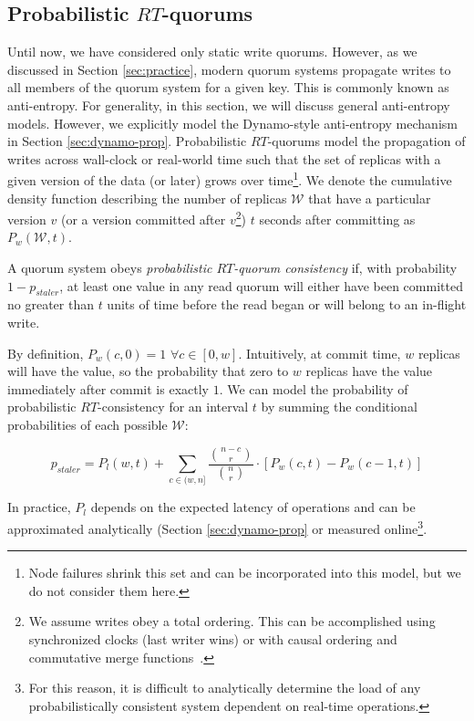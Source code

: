 \documentclass{vldb}
\begin{document}
\subsection{Probabilistic $RT$-quorums}

Until now, we have considered only static write quorums.  However, as
we discussed in Section \ref{sec:practice}, modern quorum systems
propagate writes to all members of the quorum system for a given key.
This is commonly known as anti-entropy.  For generality, in this
section, we will discuss general anti-entropy models. However, we
explicitly model the Dynamo-style anti-entropy mechanism in Section
\ref{sec:dynamo-prop}.  Probabilistic $RT$-quorums model the
propagation of writes across wall-clock or real-world time such that
the set of replicas with a given version of the data (or later) grows
over time\footnote{Node failures shrink this set and can be
  incorporated into this model, but we do not consider them here.}.
We denote the cumulative density function describing the number of
replicas $\mathcal{W}$ that have a particular version $v$ (or a
version committed after $v$\footnote{We assume writes obey a total
  ordering. This can be accomplished using synchronized clocks (last
  writer wins) or with causal ordering and commutative merge
  functions~\cite{cops}.}) $t$ seconds after committing as
$P_w(\mathcal{W}, t)$.

\begin{definition}
A quorum system obeys \textit{probabilistic $RT$-quorum consistency}
if, with probability $1-p_{staler}$, at least one value in any read
quorum will either have been committed no greater than $t$ units of
time before the read began or will belong to an in-flight write.
\end{definition}

By definition, $P_w(c,0) = 1$ $\forall c \in [0, w]$.  Intuitively, at
commit time, $w$ replicas will have the value, so the probability that
zero to $w$ replicas have the value immediately after commit is
exactly $1$.  We can model the probability of probabilistic $RT$-consistency for an interval $t$ by summing the conditional probabilities of each possible $\mathcal{W}$:

\begin{equation}
p_{staler} = P_l(w, t)+\sum_{c\in(w, n]} \frac{{n-c \choose r}}{{n \choose r}}\cdot [P_w(c, t)-P_w(c-1,t)]
\end{equation}

In practice, $P_l$ depends on the expected latency of operations and can be
approximated analytically (Section \ref{sec:dynamo-prop} or measured
online\footnote{For this reason, it is difficult to analytically
  determine the load of any probabilistically consistent system
  dependent on real-time operations.}.
\end{document}
